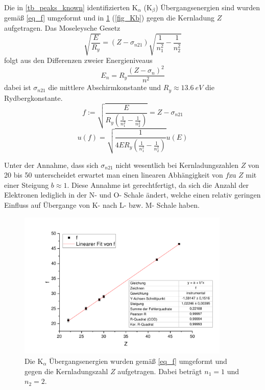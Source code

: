 \documentclass[
	a4paper,
	12pt,
	pagesize,
	ngerman
]{scrartcl}
\begin{document}
	Die in \cref{tb_peaks_known} identifizierten $\text{K}_\alpha$ ($\text{K}_\beta$) Übergangsenergien sind wurden gemäß \cref{eq_f} umgeformt und in \cref{fig_Ka} (\cref{fig_Kb}) gegen die Kernladung $Z$ aufgetragen.
	Das Moseleysche Gesetz
	\begin{equation}
		\label{eq_moseley}
		\sqrt{\frac{E}{R_y}} = (Z-\sigma_{n21}) \sqrt{\frac{1}{n_1^2}-\frac{1}{n_2^2}}
	\end{equation}
	folgt aus den Differenzen zweier Energieniveaus
	\begin{equation}
		\label{eq_energie}
		E_n = R_y\frac{(Z-\sigma_n)^2}{n^2}
	\end{equation}
	dabei ist $\sigma_{n21}$ die mittlere Abschirmkonstante und $R_y\approx\SI{13.6}{eV}$ die Rydbergkonstante.
	\begin{equation}
		\label{eq_f}
		f := \sqrt{\frac{E}{R_y (\frac{1}{n_1^2}-\frac{1}{n_2^2})}} = Z -\sigma_{n21}
	\end{equation}
	\begin{equation}
		\label{eq_u_f}
		u(f) = \sqrt{\frac{1}{4 E R_y (\frac{1}{n_1^2}-\frac{1}{n_2^2})}} u(E)
	\end{equation}
	
	Unter der Annahme, dass sich $\sigma_{n21}$ nicht wesentlich bei Kernladungszahlen $Z$ von 20 bis 50 unterscheidet erwartet man einen linearen Abhängigkeit von $f$zu $Z$ mit einer Steigung $b\approx1$. 
	Diese Annahme ist gerechtfertigt, da sich die Anzahl der Elektronen lediglich in der N- und O- Schale ändert, welche einen relativ geringen Einfluss auf Übergange von K- nach L- bzw. M- Schale haben.
	
	\begin{figure}[H]
		\includegraphics[width=0.9\textwidth]{Ka}
		\centering
		\caption{Die $\text{K}_\alpha$ Übergangsenergien wurden gemäß \cref{eq_f} umgeformt und gegen die Kernladungszahl $Z$ aufgetragen. Dabei beträgt $n_1=1$ und $n_2=2$.}
		\label{fig_Ka}
		\centering
	\end{figure}
	
\end{document}
